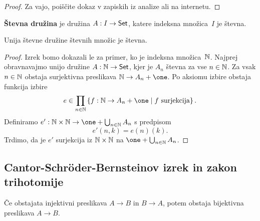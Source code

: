 \begin{proof}
  Za vajo, poiščite dokaz v zapiskih iz analize ali na internetu.
\end{proof}

\begin{definicija}
  \textbf{Števna družina} je družina $A : I \to \mathsf{Set}$, katere indeksna množica~$I$ je števna.
\end{definicija}

\begin{izrek}
  Unija števne družine števnih množic je števna.
\end{izrek}

\begin{proof}
  Izrek bomo dokazali le za primer, ko je indeksna množica~$\mathbb{N}$.
  Najprej obravnavajmo unijo družine $A : \mathbb{N} \to \mathsf{Set}$, kjer je $A_n$ števna za vse $n \in \mathbb{N}$.
  Za vsak $n \in \mathbb{N}$ obstaja surjektivna preslikava $\NN \to A_n + \one$. Po aksiomu izbire obstaja funkcija izbire
  \begin{equation*}
    e \in \prod_{n \in \NN} \set{f : \NN \to A_n + \one \such \text{$f$ surjekcija}}.
  \end{equation*}
  Definiramo $e' : \NN \times \NN \to \one + \bigcup_{n \in \NN} A_n$ s predpisom
  \begin{equation*}
    e'(n, k) = e(n)(k).
  \end{equation*}
  Trdimo, da je $e'$ surjekcija iz $\mathbb{N} \times \mathbb{N}$ na $\one + \bigcup_{n \in \NN} A_n$.
\end{proof}


\subsection{Cantor-Schröder-Bernsteinov izrek in zakon trihotomije}

\begin{izrek}
  Če obstajata injektivni preslikava $A \to B$ in $B \to A$, potem obstaja bijektivna preslikava $A \to B$.
\end{izrek}

